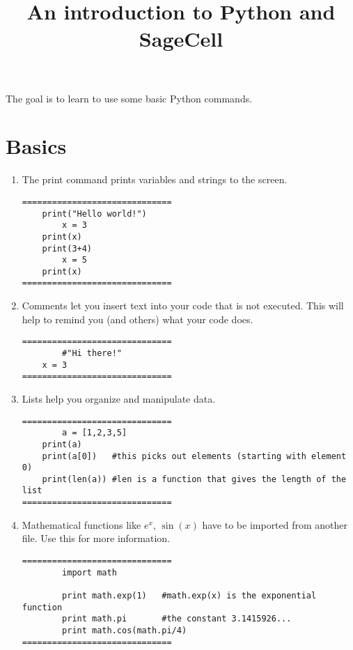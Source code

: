 \documentclass{ximera}
\title{An introduction to Python and SageCell}
\begin{document}
The goal is to learn to use some basic Python commands.
\begin{abstract}  
\end{abstract}  
\maketitle

\section{Basics}

    \begin{enumerate}
        \item The print command prints variables and strings to the screen.
\begin{verbatim}
==============================
	print("Hello world!")
        x = 3
	print(x)
	print(3+4)
        x = 5
	print(x)
==============================
\end{verbatim}

	\item Comments let you insert text into your code that is not executed. This will help to remind you (and others) what your code does.
\begin{verbatim}
==============================
        #"Hi there!"
	x = 3
==============================
\end{verbatim}
	\item Lists help you organize and manipulate data.
\begin{verbatim}
==============================
        a = [1,2,3,5]
	print(a)
	print(a[0])   #this picks out elements (starting with element 0)
	print(len(a)) #len is a function that gives the length of the list
==============================
\end{verbatim}
	\item Mathematical functions like $e^x$, $\sin(x)$ have to be imported from another file. Use this  for more information.
\begin{verbatim}
==============================
        import math

        print math.exp(1)   #math.exp(x) is the exponential function
        print math.pi       #the constant 3.1415926...
        print math.cos(math.pi/4)
==============================
\end{verbatim}
    \end{enumerate}
\end{document}
